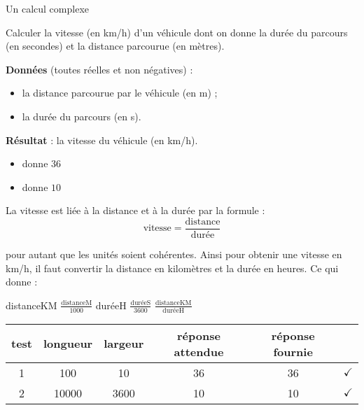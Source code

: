 \begin{Fiche}{Un calcul complexe}
\label{fiche:calcul-complexe}

	Calculer la vitesse (en km/h) d'un véhicule dont on donne
	la durée du parcours (en secondes) 
	et la distance parcourue (en mètres).

	
	\textbf{Données} (toutes réelles et non négatives) :
		\begin{itemize}
		\item la distance parcourue par le véhicule (en m) ;
		\item la durée du parcours (en s).
		\end{itemize}
		
	\textbf{Résultat} : la vitesse du véhicule (en km/h).

	\begin{center}
	\end{center}


	\begin{itemize}
	\item {} donne $36$
	\item {} donne $10$
	\end{itemize}


	La vitesse est liée à la distance et à la durée par la formule :
	\[
		\textrm{vitesse} = \frac{\textrm{distance}}{\textrm{durée}}
	\]

	pour autant que les unités soient cohérentes.
	Ainsi pour obtenir une vitesse en km/h, 
	il faut convertir la distance en kilomètres 
	et la durée en heures.
	Ce qui donne :
		
	\begin{LDA}
			\Let distanceKM \Gets $\frac{\textrm{distanceM}}{1000}$
			\Let duréeH \Gets $\frac{\textrm{duréeS}}{3600}$
			\Return $\frac{\textrm{distanceKM}}{\textrm{duréeH}}$
		\EndAlgo
	\end{LDA}


	\begin{center}
		\begin{tabular}{|c|cccc|c|}
		\hline
		test \no & longueur & largeur & réponse attendue & réponse fournie & {} \\\hline
		\hline 
		1 & 100   & 10   & 36 & 36 & {\color{ForestGreen}$\checkmark$} \\\hline
		2 & 10000 & 3600 & 10 & 10 & {\color{ForestGreen}$\checkmark$} \\\hline
		\end{tabular}
	\end{center}								


\end{Fiche}
